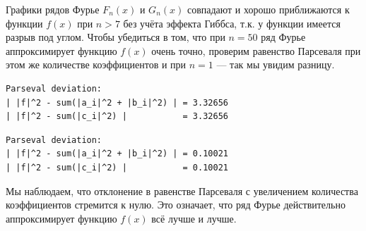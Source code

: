 \documentclass[a4paper]{article}
\begin{document}
Графики рядов Фурье $F_n(x)$ и $G_n(x)$ совпадают и хорошо приближаются к функции $f(x)$ при $n > 7$ без учёта эффекта Гиббса, т.к. у функции имеется разрыв под углом.\newpage\noindent
Чтобы убедиться в том, что при $n = 50$ ряд Фурье аппроксимирует функцию $f(x)$ очень точно, проверим равенство Парсеваля при этом же количестве коэффициентов и при $n = 1$ --- так мы увидим разницу.\\
\begin{minipage}{0.48\textwidth}
\begin{lstlisting}[caption={Равенство Парасеваля при $n=1$}]
Parseval deviation:
| |f|^2 - sum(|a_i|^2 + |b_i|^2) | = 3.32656
| |f|^2 - sum(|c_i|^2) |           = 3.32656
\end{lstlisting}
\end{minipage}\hfill
\begin{minipage}{0.49\textwidth}
\begin{lstlisting}[caption={Равенство Парасеваля при $n=50$}, numbers=none]
Parseval deviation:
| |f|^2 - sum(|a_i|^2 + |b_i|^2) | = 0.10021
| |f|^2 - sum(|c_i|^2) |           = 0.10021
\end{lstlisting}
\end{minipage}
Мы наблюдаем, что отклонение в равенстве Парсеваля с увеличением количества коэффициентов стремится к нулю. Это означает, что ряд Фурье действительно аппроксимирует функцию $f(x)$ всё лучше и лучше.\\[0.5em]
\end{document}
